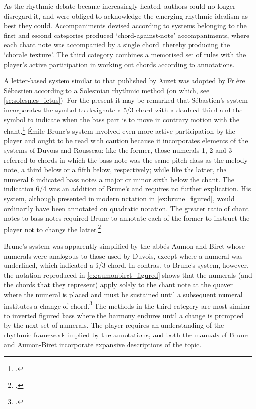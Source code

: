 As the rhythmic debate became increasingly heated, authors could no longer disregard it, and were obliged to acknowledge the emerging rhythmic idealism as best they could.
Accompaniments devised according to systems belonging to the first and second categories produced `chord-against-note' accompaniments, where each chant note was accompanied by a single chord, thereby producing the `chorale texture'.
The third category combines a memorised set of rules with the player's active participation in working out chords according to annotations.
\nowidow[2]

%
A letter-based system similar to that published by Auzet was adopted by Fr[ère] Sébastien according to a Solesmian rhythmic method (on which, see \cref{sc:solesmes_ictus}).
For the present it may be remarked that Sébastien's system incorporates the \dagger{} symbol to designate a 5/3 chord with a doubled third and the \times{} symbol to indicate when the bass part is to move in contrary motion with the chant.\footcite[12--20, 40]{SebastienAccompagnementchantgregorien1910}
%
Émile Brune's system involved even more active participation by the player and ought to be read with caution because it incorporates elements of the systems of Duvois and Rousseau: like the former, those numerals 1, 2 and 3 referred to chords in which the bass note was the same pitch class as the melody note, a third below or a fifth below, respectively; while like the latter, the numeral 6 indicated bass notes a major or minor sixth below the chant.
The indication 6/4 was an addition of Brune's and requires no further explication.
His system, although presented in modern notation in \cref{ex:brune_figured}, would ordinarily have been annotated on quadratic notation.
The greater ratio of chant notes to bass notes required Brune to annotate each of the former to instruct the player not to change the latter.\footcite[pp.~x, 115]{BruneNouvellemethodeelementaire1903}

%
Brune's system was apparently simplified by the abbés Aumon and Biret whose numerals were analogous to those used by Duvois, except where a numeral was underlined, which indicated a 6/3 chord.
In contrast to Brune's system, however, the notation reproduced in \cref{ex:aumonbiret_figured} shows that the numerals (and the chords that they represent) apply solely to the chant note at the quaver where the numeral is placed and must be sustained until a subsequent numeral institutes a change of chord.\footcite[125]{AumonMethodefacilecomplete1926}
The methods in the third category are most similar to inverted figured bass where the harmony endures until a change is prompted by the next set of numerals.
The player requires an understanding of the rhythmic framework implied by the annotations, and both the manuals of Brune and Aumon-Biret incorporate expansive descriptions of the topic.


